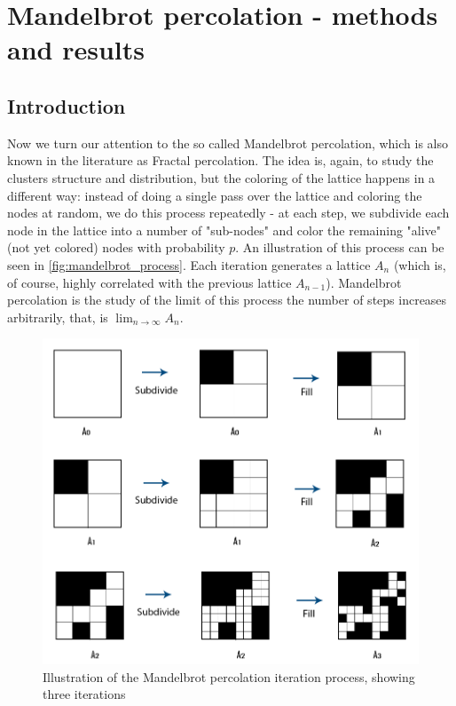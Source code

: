 \chapter{Mandelbrot percolation - methods and results}
\label{ch:mandelbrot_experimental}

\section{Introduction}

Now we turn our attention to the so called Mandelbrot percolation, which is also known in the literature as Fractal percolation. The idea is, again, to study the clusters structure and distribution, but the coloring of the lattice happens in a different way: instead of doing a single pass over the lattice and coloring the nodes at random, we do this process repeatedly - at each step, we subdivide each node in the lattice into a number of "sub-nodes" and color the remaining "alive" (not yet colored) nodes with probability $p$. An illustration of this process can be seen in \autoref{fig:mandelbrot_process}. 
Each iteration generates a lattice $A_n$ (which is, of course, highly correlated with the previous lattice $A_{n-1}$). Mandelbrot percolation is the study of the limit of this process the number of steps increases arbitrarily, that, is $\lim_{n\to\infty} A_n$.

\begin{figure}[H]
  \includegraphics[width=\linewidth]{Images/mandelbrot_process.png}
  \caption{Illustration of the Mandelbrot percolation iteration process, showing three iterations}
  \label{fig:mandelbrot_process}
\end{figure}


